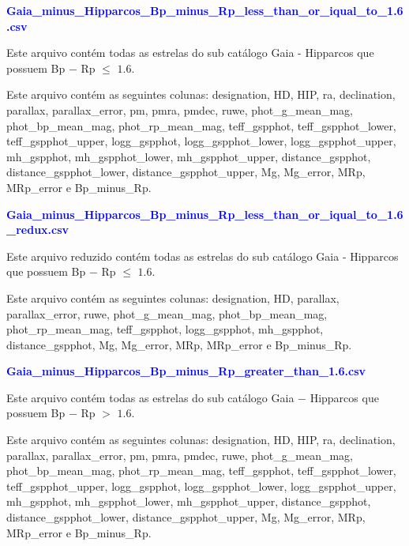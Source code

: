 \documentclass{article}
\begin{document}
	\vspace{10pt}

	\textcolor{blue}{\textbf{Gaia\_minus\_Hipparcos\_Bp\_minus\_Rp\_less\_than\_or\_iqual\_to\_1.6.csv}}
		
	\vspace{10pt}
	
	
	Este arquivo contém todas as estrelas do sub catálogo Gaia - Hipparcos que possuem Bp $-$ Rp $\leq$ $1.6$.
	
	Este arquivo contém as seguintes colunas:
	designation, HD, HIP, ra, declination, parallax, parallax\_error, pm, pmra, pmdec, ruwe, phot\_g\_mean\_mag, phot\_bp\_mean\_mag, phot\_rp\_mean\_mag, teff\_gspphot, teff\_gspphot\_lower, teff\_gspphot\_upper, logg\_gspphot, logg\_gspphot\_lower, logg\_gspphot\_upper, mh\_gspphot, mh\_gspphot\_lower, mh\_gspphot\_upper, distance\_gspphot, distance\_gspphot\_lower, distance\_gspphot\_upper, Mg, Mg\_error, MRp, MRp\_error e Bp\_minus\_Rp.
	
	\newpage
	
	\vspace{10pt}

	\textcolor{blue}{\textbf{Gaia\_minus\_Hipparcos\_Bp\_minus\_Rp\_less\_than\_or\_iqual\_to\_1.6\_redux.csv}}
	
	\vspace{10pt}
	
	
	Este arquivo reduzido contém todas as estrelas do sub catálogo Gaia - Hipparcos que possuem Bp $-$ Rp $\leq$ $1.6$.
	
	Este arquivo contém as seguintes colunas:
	designation, HD, parallax, parallax\_error, ruwe, phot\_g\_mean\_mag, phot\_bp\_mean\_mag, phot\_rp\_mean\_mag, teff\_gspphot, logg\_gspphot, mh\_gspphot, distance\_gspphot, Mg, Mg\_error, MRp, MRp\_error e Bp\_minus\_Rp.
	
	\vspace{10pt}

	\textcolor{blue}{\textbf{Gaia\_minus\_Hipparcos\_Bp\_minus\_Rp\_greater\_than\_1.6.csv}}
	
	\vspace{10pt}
	
	Este arquivo contém todas as estrelas do sub catálogo Gaia $-$ Hipparcos que possuem Bp $-$ Rp $>$ $1.6$.
	
	Este arquivo contém as seguintes colunas:
	designation, HD, HIP, ra, declination, parallax, parallax\_error, pm, pmra, pmdec, ruwe, phot\_g\_mean\_mag, phot\_bp\_mean\_mag, phot\_rp\_mean\_mag, teff\_gspphot, teff\_gspphot\_lower, teff\_gspphot\_upper, logg\_gspphot, logg\_gspphot\_lower, logg\_gspphot\_upper, mh\_gspphot, mh\_gspphot\_lower, mh\_gspphot\_upper, distance\_gspphot, distance\_gspphot\_lower, distance\_gspphot\_upper, Mg, Mg\_error, MRp, MRp\_error e Bp\_minus\_Rp.
	
\end{document}
